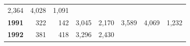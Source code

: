 \documentclass[]{article}
\begin{document}
\begin{longtable}[]{@{}rrrrrrrr@{}}
\begin{minipage}[t]{0.09\columnwidth}
2,364\strut
\end{minipage} & \begin{minipage}[t]{0.08\columnwidth}\raggedleft\strut
4,028\strut
\end{minipage} & \begin{minipage}[t]{0.10\columnwidth}\raggedleft\strut
1,091\strut
\end{minipage}\tabularnewline
\begin{minipage}[t]{0.08\columnwidth}\raggedleft\strut
\textbf{1991}\strut
\end{minipage} & \begin{minipage}[t]{0.10\columnwidth}\raggedleft\strut
322\strut
\end{minipage} & \begin{minipage}[t]{0.11\columnwidth}\raggedleft\strut
142\strut
\end{minipage} & \begin{minipage}[t]{0.08\columnwidth}\raggedleft\strut
3,045\strut
\end{minipage} & \begin{minipage}[t]{0.14\columnwidth}\raggedleft\strut
2,170\strut
\end{minipage} & \begin{minipage}[t]{0.09\columnwidth}\raggedleft\strut
3,589\strut
\end{minipage} & \begin{minipage}[t]{0.08\columnwidth}\raggedleft\strut
4,069\strut
\end{minipage} & \begin{minipage}[t]{0.10\columnwidth}\raggedleft\strut
1,232\strut
\end{minipage}\tabularnewline
\begin{minipage}[t]{0.08\columnwidth}\raggedleft\strut
\textbf{1992}\strut
\end{minipage} & \begin{minipage}[t]{0.10\columnwidth}\raggedleft\strut
381\strut
\end{minipage} & \begin{minipage}[t]{0.11\columnwidth}\raggedleft\strut
418\strut
\end{minipage} & \begin{minipage}[t]{0.08\columnwidth}\raggedleft\strut
3,296\strut
\end{minipage} & \begin{minipage}[t]{0.14\columnwidth}\raggedleft\strut
2,430\strut
\end{minipage} & \begin{minipage}[t]{0.09\columnwidth}\raggedleft\strut

\end{minipage}
\end{longtable}
\end{document}
